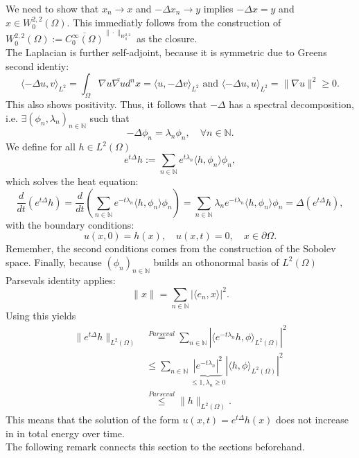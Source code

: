 \documentclass[A4,12pt,twoside]{book}
\begin{document}
We need to show that $x_n \to x$ and $-\Delta x_n \to y$ implies $-\Delta x= y$ and $x \in W_0^{2,2}(\Omega)$. This immediatly follows from the construction  of $W_0^{2,2} (\Omega) := \overline{ C_0^\infty(\Omega)}^{\| \cdot \|_{W_0^{2,2} }}$ as the closure.\\
The Laplacian is further self-adjoint, because it is symmetric due to Greens second identiy:
\[
\langle - \Delta u,v \rangle_{L^2} = \int_\Omega \nabla u \overline{\nabla u} d^n x = \langle u, - \Delta v \rangle_{L^2} \text{ and } \langle -\Delta u,u \rangle_{L^2 } = \| \nabla u \|^2 \geq 0.
\]
This also shows positivity. Thus, it follows that $-\Delta$ has a spectral decomposition, i.e. $\exists (\phi_n,\lambda_n)_{n \in \mathbb{N}}$ such that 
\[
- \Delta \phi_n = \lambda_n \phi_n, \quad \forall n \in \mathbb{N}.
\]
We define for all $h \in L^2(\Omega)$
\[
e^{t \Delta} h := \sum_{n \in \mathbb{N}} e^{t \lambda_n} \langle h,\phi_n \rangle \phi_n,
\]
which solves the heat equation: 
\[
\frac{d}{dt} \left( e^{t \Delta} h \right) = \frac{d}{dt} \left( \sum_{n \in \mathbb{N}} e^{-t \lambda_n} \langle h,\phi_n \rangle \phi_n \right)=\sum_{n \in \mathbb{N}}\lambda_n e^{-t \lambda_n} \langle h,\phi_n \rangle \phi_n  = \Delta \left(e^{t \Delta} h\right),
\]
with the boundary conditions: 
\[
u(x,0)=h(x), \quad u(x,t)=0, \quad x \in \partial \Omega.
\]
Remember, the second conditions comes from the construction of the Sobolev space. Finally, because $(\phi_n)_{n \in \mathbb{N}}$ builds an othonormal basis of $L^2(\Omega)$ Parsevals identity applies:
\[
\| x \| = \sum_{n \in \mathbb{N}} |\langle e_n, x \rangle |^2.
\]
Using this yields  
\begin{align*}
    \| e^{t \Delta} h \|_{L^2(\Omega)} &\stackrel{Parseval}{=} \sum_{n \in \mathbb{N}} | \langle e^{-t \lambda_n}  h,\phi \rangle_{L^2(\Omega)} |^2 \\
    &\leq \sum_{n \in \mathbb{N}} \underbrace{|e^{-t \lambda_n}|^2}_{\leq 1, \lambda_n \geq 0} | \langle h,\phi \rangle_{L^2(\Omega)} |^2 \\
    & \stackrel{Parseval}{\leq} \| h \|_{L^2(\Omega)}.
\end{align*} 
This means that the solution of the form $u(x ,t) = e^{t \Delta} h(x)$ does not increase in in total energy over time.\\
The following remark connects this section to the sections beforehand.
\end{document}
